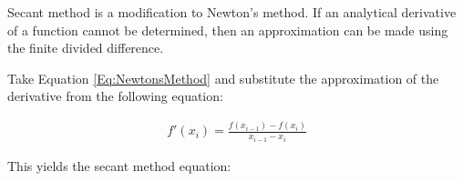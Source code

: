 \documentclass{../../KDHnotes}
\begin{document}
Secant method is a modification to Newton's method. If an analytical derivative of a function cannot be determined, then an approximation can be made using the finite divided difference.

Take Equation \ref{Eq:NewtonsMethod} and substitute the approximation of the derivative from the following equation:

\begin{align}
  f'(x_i) = \frac{f(x_{i-1})-f(x_i)}{x_{i-1}-x_{i}}
\end{align}

This yields the secant method equation:



\nocite{NumMethods}
\nocite{holisticnumericalmethods}

\newpage



\end{document}
